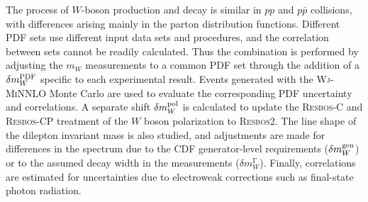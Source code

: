 
The process of $W$-boson production and decay is similar in $pp$ and $p\bar{p}$
collisions, with differences arising mainly in the parton distribution functions.
Different PDF sets use different input data sets and procedures, and the correlation 
between sets cannot be readily calculated.  Thus the combination is performed by 
adjusting the $m_W$ measurements to a common PDF set through the addition of a 
$\delta m_W^{\scriptsize\textrm{PDF}}$ specific to each experimental result.
Events generated with the {\textsc{Wj-MiNNLO}} Monte Carlo are used to
evaluate the corresponding PDF uncertainty and correlations.  A separate shift
$\delta m_W^{\scriptsize\textrm{pol}}$ is calculated to update the {\textsc{Resbos-C}}
and {\textsc{Resbos-CP}} treatment of the $W$ boson polarization to {\textsc{Resbos2}}.
The line shape of the dilepton invariant mass is also studied, and adjustments are made
for differences in the spectrum due to the CDF generator-level requirements
($\delta m_W^{\scriptsize\textrm{gen}}$) or to the assumed decay width in the measurements 
($\delta m_W^{\mathrm\Gamma}$).  Finally, correlations are estimated for uncertainties
due to electroweak corrections such as final-state photon radiation.
